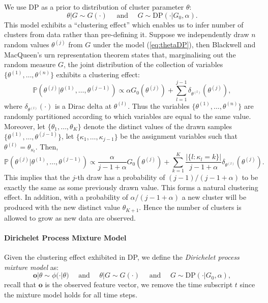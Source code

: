 We use DP as a prior to distribution of cluster parameter $\theta$:
\begin{equation}
\theta | G \sim G(\cdot) \quad\text{ and }\quad G \sim \text{DP} (\cdot | G_0, \alpha).
\label{eq:thetaDP}
\end{equation}
This model exhibits a ``clustering effect'' which enables us to infer number of clusters from data rather than pre-defining it. Suppose we independently draw $n$ random values $\theta^{(j)}$ from $G$ under the model (\ref{eq:thetaDP}), then Blackwell and MacQueen's urn representation theorem \cite{blackwellm73} states that, marginalising out the random measure $G$, the joint distribution of the collection of variables $\{\theta^{(1)}, \dots, \theta^{(n)}\}$ exhibits a clustering effect:
\begin{equation}
\mathbb{P} \left( \theta^{(j)} | \theta^{(1)}, \dots, \theta^{(j-1)} \right) \propto \alpha G_0 (\theta^{(j)}) + \sum_{l=1}^{j-1} \delta_{\theta^{(l)}} (\theta^{(j)}),
\end{equation}
where $\delta_{\theta^{(l)}} (\cdot)$ is a Dirac delta at ${\theta^{(l)}}$. Thus the variables $\{\theta^{(1)}, \dots, \theta^{(n)}\}$ are randomly partitioned according to which variables are equal to the same value. Moreover, let $\{ \theta_1, \dots, \theta_K \}$ denote the distinct values of the drawn samples $\{\theta^{(1)}, \dots, \theta^{(j-1)}\}$, let $\{\kappa_1, \dots, \kappa_{j-1}\}$ be the assignment variables such that $\theta^{(l)} = \theta_{\kappa_l}$. Then,
\begin{equation}
\mathbb{P} \left( \theta^{(j)} | \theta^{(1)}, \dots, \theta^{(j-1)} \right) \propto \frac{\alpha}{j-1+\alpha} G_0 (\theta^{(j)}) + \sum_{k=1}^{K} \frac{\vert \{ l: \kappa_l = k \} \vert}{j-1+\alpha}  \delta_{\theta^{(l)}} (\theta^{(j)}).
\end{equation}
This implies that the $j$-th draw has a probability of $(j-1)/(j-1+\alpha)$ to be exactly the same as some previously drawn value. This forms a natural clustering effect. In addition, with a probability of $\alpha/(j-1+\alpha)$ a new cluster will be produced with the new distinct value $\theta_{K+1}$. Hence the number of clusters is allowed to grow as new data are observed.

\paragraph*{Dirichelet Process Mixture Model}

Given the clustering effect exhibited in DP, we define the \textit{Dirichelet process mixture model} as:
\begin{equation}
\mathbf{o} | \theta \sim \phi(\cdot | \theta) \quad\text{ and }\quad  \theta | G \sim G(\cdot) \quad\text{ and }\quad G \sim \text{DP} (\cdot | G_0, \alpha),
\label{eq:DPMM}
\end{equation}
recall that $\mathbf{o}$ is the observed feature vector, we remove the time subscript $t$ since the mixture model holds for all time steps.

